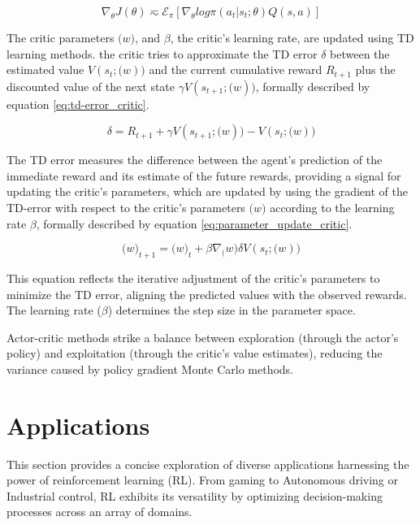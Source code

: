 \begin{equation}
    \label{eq:gradient_actor_critic}
    \nabla_\theta J(\theta) \eqsim \mathcal{E}_\pi[\nabla_\theta log \pi(a_t|s_t;\theta)Q(s,a)]
\end{equation}

The critic parameters $\mathcal(w)$, and $\beta$, the critic's learning rate, are updated using TD learning methods. the critic tries to approximate the TD error $\delta$ between the estimated value $V(s_t;\mathcal(w))$ and the current cumulative reward $R_{t+1}$ plus the discounted value of the next state $\gamma V(s_{t+1};\mathcal(w))$, formally described by equation \ref{eq:td-error_critic}.

\begin{equation}
    \label{eq:td-error_critic}
    \delta = R_{t+1} + \gamma V(s_{t+1};\mathcal(w)) - V(s_t;\mathcal(w))
\end{equation}

The TD error measures the difference between the agent's prediction of the immediate reward and its estimate of the future rewards, providing a signal for updating the critic's parameters, which are updated by using the gradient of the TD-error with respect to the critic's parameters $\mathcal(w)$ according to the learning rate $\beta$, formally described by equation \ref{eq:parameter_update_critic}.

\begin{equation}
    \label{eq:parameter_update_critic}
    \mathcal(w)_{t+1} = \mathcal(w)_t + \beta \nabla_\mathcal(w) \delta V(s_t;\mathcal(w))
\end{equation}

This equation reflects the iterative adjustment of the critic's parameters to minimize the TD error, aligning the predicted values with the observed rewards. The learning rate ($\beta$) determines the step size in the parameter space.

Actor-critic methods strike a balance between exploration (through the actor's policy) and exploitation (through the critic's value estimates), reducing the variance caused by policy gradient Monte Carlo methods.

\section{Applications}\label{sec:rl-applications}
This section provides a concise exploration of diverse applications harnessing the power of reinforcement learning (RL). From gaming to Autonomous driving or Industrial control, RL exhibits its versatility by optimizing decision-making processes across an array of domains.

